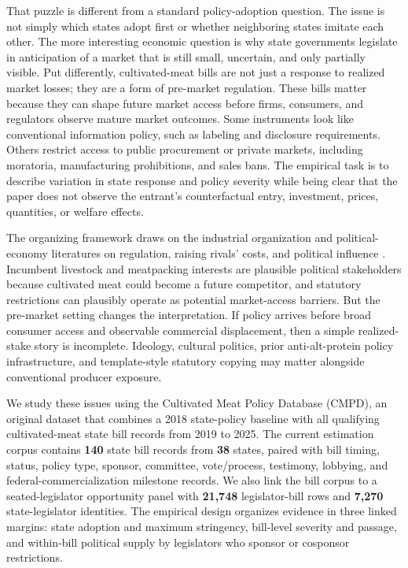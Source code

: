 \documentclass[12pt]{article}
\begin{document}
That puzzle is different from a standard policy-adoption question.  The issue is not simply which states adopt first or whether neighboring states imitate each other.  The more interesting economic question is why state governments legislate in anticipation of a market that is still small, uncertain, and only partially visible.  Put differently, cultivated-meat bills are not just a response to realized market losses; they are a form of pre-market regulation.  These bills matter because they can shape future market access before firms, consumers, and regulators observe mature market outcomes.  Some instruments look like conventional information policy, such as labeling and disclosure requirements.  Others restrict access to public procurement or private markets, including moratoria, manufacturing prohibitions, and sales bans.  The empirical task is to describe variation in state response and policy severity while being clear that the paper does not observe the entrant's counterfactual entry, investment, prices, quantities, or welfare effects.

The organizing framework draws on the industrial organization and political-economy literatures on regulation, raising rivals' costs, and political influence \citep{stigler1971theory, peltzman1976toward, grossman1994protection}.  Incumbent livestock and meatpacking interests are plausible political stakeholders because cultivated meat could become a future competitor, and statutory restrictions can plausibly operate as potential market-access barriers.  But the pre-market setting changes the interpretation.  If policy arrives before broad consumer access and observable commercial displacement, then a simple realized-stake story is incomplete.  Ideology, cultural politics, prior anti-alt-protein policy infrastructure, and template-style statutory copying may matter alongside conventional producer exposure.

We study these issues using the Cultivated Meat Policy Database (CMPD), an original dataset that combines a 2018 state-policy baseline with all qualifying cultivated-meat state bill records from 2019 to 2025.  The current estimation corpus contains \textbf{140} state bill records from \textbf{38} states, paired with bill timing, status, policy type, sponsor, committee, vote/process, testimony, lobbying, and federal-commercialization milestone records.  We also link the bill corpus to a seated-legislator opportunity panel with \textbf{21,748} legislator-bill rows and \textbf{7,270} state-legislator identities.  The empirical design organizes evidence in three linked margins: state adoption and maximum stringency, bill-level severity and passage, and within-bill political supply by legislators who sponsor or cosponsor restrictions.
\end{document}
